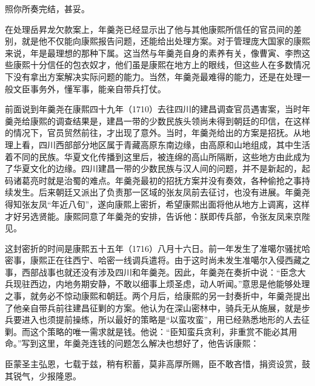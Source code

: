 
\begin{bookquote}照你所奏完结，甚妥。\end{bookquote}


在处理岳昇龙欠款案上，年羹尧已经显示出了他与其他康熙所信任的官员间的差别，就是他不仅能向康熙报告问题，还能给出处理方案。对于管理庞大国家的康熙来说，年是最理想的那种下属。这当然与年羹尧自身的素养有关，像曹寅、李煦这些康熙十分信任的包衣奴才，他们虽是康熙在地方上的眼线，但这些人在多数情况下没有拿出方案解决实际问题的能力。当然，年羹尧最难得的能力，还是在处理一般文臣事务外，懂军事，能亲自带兵打仗。



前面说到年羹尧在康熙四十九年（1710）去往四川的建昌调查官员遇害案，当时年羹尧给康熙的调查结果是，建昌一带的少数民族头领尚未得到朝廷的印信，在这样的情况下，官员贸然前往，才出现了意外。当时，年羹尧给出的方案是招抚。从地理上看，四川西部部分地区属于青藏高原东南边缘，由高原和山地组成，其中生活着不同的民族。华夏文化传播到这里后，被连绵的高山所隔断，这些地方由此成为了华夏文化的边缘。四川建昌一带的少数民族与汉人间的问题，并不是新起的，起码诸葛亮时就是治蜀的难点。年羹尧最初的招抚方案并没有奏效，各种偷抢之事持续发生。后来朝廷又派出了负责那一区域的张友凤前去征讨，也没有进展。年羹尧得知张友凤“年近八旬”，遂向康熙上密折，希望康熙出面将他从地方上调离，这样才好另选贤能。康熙同意了年羹尧的安排，告诉他：朕即传兵部，令张友凤来京陛见。



这封密折的时间是康熙五十五年（1716）八月十六日。前一年发生了准噶尔骚扰哈密事，康熙正在往西宁、哈密一线调兵遣将。由于这时尚未发生准噶尔入侵西藏之事，西部战事也就还没有涉及四川和年羹尧。因此，年羹尧在奏折中说：“臣念大兵现驻西边，内地务期安静，不敢以细事上烦圣虑，动人听闻。”意思是他能够处理之事，就务必不惊动康熙和朝廷。两个月后，给康熙的另一封奏折中，年羹尧提出了他亲自带兵前往建昌征剿的方案。他认为在深山密林中，骑兵无从施展，就是步兵要进入也须提前操练，所以最好的策略是“以蛮攻蛮”，用已经熟悉地形的人去征剿。而这个策略的唯一需求就是钱。他说：“臣知蛮兵贪利，非重赏不能必其用命。”写到这里，年羹尧连钱的问题怎么解决也想好了，他告诉康熙：



\begin{bookquote}臣蒙圣主弘恩，七载于兹，稍有积蓄，莫非高厚所赐，臣不敢吝惜，捐资设赏，鼓其锐气，少报隆恩。\end{bookquote}


